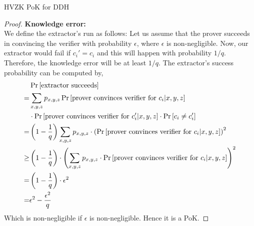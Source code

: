 \begin{solution}{HVZK PoK for DDH}
\begin{proof}
\newpage
    \textbf{Knowledge error:}\\
    We define the extractor's run as follows: 
    Let us assume that the prover succeeds in convincing the verifier with probability $\epsilon$, where $\epsilon$ is non-negligible. Now, our extractor would fail if $c_i' = c_i$ and this will happen with probability $1/q$. Therefore, the knowledge error will be at least $1/q$. The extractor's success probability can be computed by,
    \begin{equation}
        \begin{split}
            &\Pr\left[ \text{extractor succeeds} \right]\\
            = &\sum_{x, y, z}p_{x,y,z}\Pr\left[ \text{prover convinces verifier for }c_i | x, y, z \right]\\
            &\cdot\Pr\left[ \text{prover convinces verifier for }c_i' | x, y, z \right] \cdot \Pr\left[ c_i \neq c_i' \right]\\
            = &\left(1 - \frac{1}{q}\right)\sum_{x, y, z}p_{x,y,z}\cdot\left(\Pr\left[ \text{prover convinces verifier for }c_i | x, y, z \right]\right)^2\\
            \geq &\left(1 - \frac{1}{q}\right) \cdot \left(\sum_{x,y,z}p_{x,y,z}\cdot \Pr\left[ \text{prover convinces verifier for }c_i | x, y, z \right]\right)^2\\
            = &\left(1 - \frac{1}{q}\right)\cdot\epsilon^2\\
            = &\epsilon^2 - \frac{\epsilon^2}{q}
        \end{split}
    \end{equation}
    Which is non-negligible if $\epsilon$ is non-negligible. Hence it is a PoK.


\end{proof}
\end{solution}
